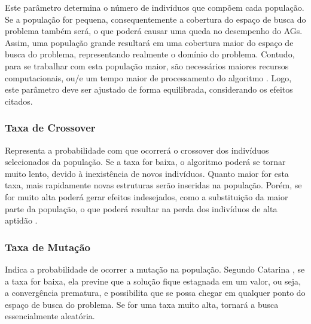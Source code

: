 Este parâmetro determina o número de indivíduos que compõem cada população. Se a população for pequena, consequentemente a cobertura do espaço de busca do problema também será, o que poderá causar uma queda no desempenho do AGs. Assim, uma população grande resultará em uma cobertura maior do espaço de busca do problema, representando realmente o domínio do problema. Contudo, para se trabalhar com esta população maior, são necessários maiores recursos computacionais, ou/e um tempo maior de processamento do algoritmo \cite{catarina03}. Logo, este parâmetro deve ser ajustado de forma equilibrada, considerando os efeitos citados.

\subsubsection{Taxa de Crossover}


Representa a probabilidade com que ocorrerá o crossover dos indivíduos selecionados da população. Se a taxa for baixa, o algoritmo poderá se tornar muito lento, devido à inexistência de novos indivíduos. Quanto maior for esta taxa, mais rapidamente novas estruturas serão inseridas na população. Porém, se for muito alta poderá gerar efeitos indesejados, como a substituição da maior parte da população, o que poderá resultar na perda dos indivíduos de alta aptidão \cite{catarina03}.

\subsubsection{Taxa de Mutação}


Indica a probabilidade de ocorrer a mutação na população. Segundo Catarina \cite{catarina03}, se a taxa for baixa, ela previne que a solução fique estagnada em um valor, ou seja, a convergência prematura, e possibilita que se possa chegar em qualquer ponto do espaço de busca do problema. Se for uma taxa muito alta, tornará a busca essencialmente aleatória.
